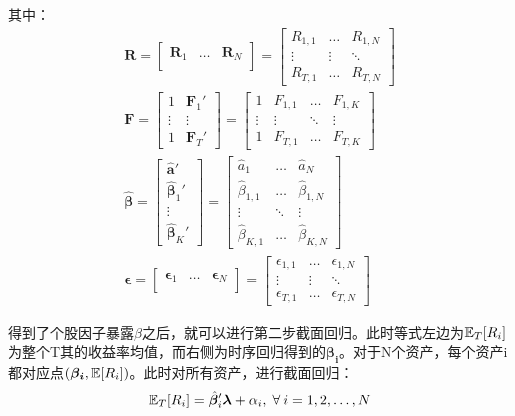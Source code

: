 \documentclass[11pt]{article}
\begin{document}
其中：
\begin{gather*}
    \bm{R} = \begin{bmatrix} \bm{R}_1 & \dots & \bm{R}_N \\ \end{bmatrix}
    = \begin{bmatrix} R_{1,1} & \dots & R_{1,N} \\ \vdots & \vdots & \ddots \\ R_{T,1} & \dots & R_{T,N} \end{bmatrix} \\
    \bm{F} = \begin{bmatrix} 1 & \bm{F}_{1}' \\ \vdots & \vdots \\ 1 & \bm{F}_{T}' \end{bmatrix}
    = \begin{bmatrix} 1 & F_{1,1} & \dots & F_{1,K} \\ \vdots & \vdots & \ddots & \vdots \\ 1 & F_{T,1} & \dots & F_{T,K} \end{bmatrix} 
    \\
    \hat{\bm{\beta}}
    = \begin{bmatrix} \hat{\bm{a}}' \\ \hat{\bm{\beta}}_{1}' \\ \vdots \\ \hat{\bm{\beta}}_{K}' \end{bmatrix}
    = \begin{bmatrix} \hat{a}_{1} & \dots & \hat{a}_{N} \\ \hat{\beta}_{1,1} & \dots & \hat{\beta}_{1,N} \\ \vdots & \ddots & \vdots \\ \hat{\beta}_{K,1} & \dots & \hat{\beta}_{K,N} \end{bmatrix}
    \\
    \bm{\epsilon} = \begin{bmatrix}
        \bm{\epsilon}_1 & \dots & \bm{\epsilon}_N \\
    \end{bmatrix}
    = \begin{bmatrix} \epsilon_{1,1} & \dots & \epsilon_{1,N} \\ \vdots & \vdots & \ddots \\ \epsilon_{T,1} & \dots & \epsilon_{T,N} \end{bmatrix}
\end{gather*}

得到了个股因子暴露$\beta$之后，就可以进行第二步截面回归。此时等式左边为$\mathbb{E}_T[R_i]$为整个T其的收益率均值，而右侧为时序回归得到的$\bm{\beta_i}$。对于N个资产，每个资产i都对应点$(\bm{\beta_i},\mathbb{E}[R_i])$。此时对所有资产，进行截面回归：
\begin{equation*}
    \E_T[R_i] = \hat{\bm{\beta}}_{i}' \bm{\lambda} + \alpha_i \ilsep \forall i=1,2,\dots,N
\end{equation*}
\end{document}
